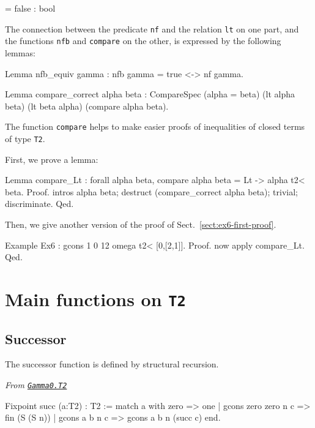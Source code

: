 {\begin{Coqanswer}
   = false
     : bool
\end{Coqanswer}

\begin{remark}
The connection between the predicate \texttt{nf} and the relation \texttt{lt} on one part, and the functions \texttt{nfb} and \texttt{compare} on the other, is expressed by the following lemmas:

\begin{Coqsrc}
Lemma nfb_equiv gamma : nfb gamma = true <-> nf gamma.

Lemma compare_correct alpha beta :
  CompareSpec (alpha = beta) (lt alpha beta) (lt beta alpha)
              (compare alpha beta).
\end{Coqsrc}

The function \texttt{compare} helps to make easier proofs of inequalities of
closed terms of type \texttt{T2}.

First, we prove a lemma:

\begin{Coqsrc}
Lemma compare_Lt : forall alpha beta, compare alpha beta = Lt -> 
                                         alpha t2< beta.
Proof.
  intros alpha beta; destruct (compare_correct alpha beta);
    trivial; discriminate. 
Qed.
\end{Coqsrc}

Then, we give another version of the proof of Sect.~\vref{sect:ex6-first-proof}.

\begin{Coqsrc}
Example Ex6 : gcons 1 0 12 omega t2< [0,[2,1]].
Proof. now apply compare_Lt. Qed.
\end{Coqsrc}

\end{remark}


\section{Main functions on \texttt{T2}}

\subsection{Successor}
The successor function is defined by structural recursion.

\noindent\emph{From \href{../theories/html/hydras.Gamma0.T2.html\#succ}%
{\texttt{Gamma0.T2}}}
\begin{Coqsrc}
Fixpoint succ (a:T2) : T2 :=
 match a with zero => one
             | gcons zero zero n c => fin (S (S n))
             | gcons a b n c => gcons a b n (succ c)
 end.
\end{Coqsrc}

}
